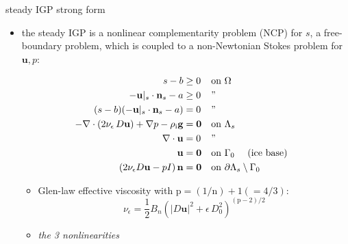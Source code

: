\documentclass[usepdftitle=false,usenames,dvipsnames]{beamer}
\newcommand{\tikzmark}[1]{\tikz[overlay,remember picture] \node (#1) {};}
\newcommand{\eps}{\epsilon}
\newcommand{\bn}{\mathbf{n}}
\newcommand{\bu}{\mathbf{u}}
\newcommand{\bzero}{\bm{0}}
\newcommand{\rhoi}{\rho_{\text{i}}}
\newcommand{\pp}{{\text{p}}}
\begin{document}
\begin{frame}{steady IGP strong form}

\begin{itemize}
\item the \alert{steady} IGP is a \alert{nonlinear complementarity problem (NCP) for $s$}, a free-boundary problem, \alert{which is coupled to a non-Newtonian Stokes problem for $\bu,p$:}

\vspace{-5mm}

\begin{align*}
s - b &\ge 0 && \text{on $\Omega$} & \tikzmark{ncptop} \\
- \bu|_s \cdot \bn_s - a &\ge 0 && \text{''} \\
(s - b) (- \bu|_s \cdot \bn_s - a) &= 0 && \text{''} & \tikzmark{ncpbot} \\
- \nabla \cdot \left(2 \nu_\eps\, D\bu\right) + \nabla p - \rhoi \mathbf{g} &= \bzero && \text{on $\Lambda_s$} & \tikzmark{gstop} \\
\nabla \cdot \bu &= 0 && \text{''} \\
\bu &= \bzero && \text{on $\Gamma_0$ \quad (ice base)} \\
\left(2 \nu_\eps D\bu - pI\right) \bn &= \bzero && \text{on $\partial \Lambda_s \setminus \Gamma_0$} & \tikzmark{gsbot}
\end{align*}



\vspace{-8mm}

    \begin{itemize}
    \item Glen-law effective viscosity with $\text{p}=(1/\text{n})+1(=4/3)$:
      $$\nu_\eps = \frac{1}{2} B_n \left(|D\bu|^2 + \eps\, D_0^2\right)^{(\pp-2)/2}$$
    \item \alert{\emph{the 3 nonlinearities}}
    \end{itemize}
\end{itemize}
\end{frame}
\end{document}
